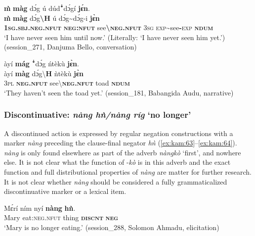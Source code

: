 \documentclass[output=paper,colorlinks,citecolor=brown]{langscibook}
\begin{document}
\ea\label{ex:kam:61} 
    \glll \textbf{\`{m}} \textbf{màg} dɔ́g ú dúdꜜdɔ́gí \textbf{jɛ́n}.\\
            \textbf{\`{m}} \textbf{màg} dɔ́g\textbf{{\textbackslash}H} ú dɔ́g{\textasciitilde}dɔ́g-i \textbf{jɛ̀n}\\
            \textbf{\textsc{1sg.sbj.neg}}\textbf{.\textsc{nfut}} \textbf{\textsc{neg}}\textbf{:\textsc{nfut}} see\textbf{{\textbackslash}}\textbf{\textsc{neg}}\textbf{.\textsc{nfut}} \textsc{3sg} \textsc{exp}{\textasciitilde}see\textbf{{}-}\textsc{exp} \textbf{\textsc{ndum}}\\
    \glt ‘I have never seen him until now.’ (Literally: ‘I have never seen him yet.’) (session\_271, Danjuma Bello, conversation)\\
\z 

\ea\label{ex:kam:62} 
    \glll àyí \textbf{mág} ꜜdɔ́g ńtèkù \textbf{jɛ̀n}.\\
        àyí \textbf{màg} dɔ́g{\textbackslash}\textbf{H} ǹtèkù \textbf{jɛ̀n}\\
        \textsc{3pl} \textbf{\textsc{neg}}\textbf{.\textsc{nfut}} see{\textbackslash}\textbf{\textsc{neg}}\textbf{.\textsc{nfut}} toad \textbf{\textsc{ndum}}\\
    \glt ‘They haven’t seen the toad yet.’ (session\_181, Babangida Audu, narrative)
\z 

\subsubsection{Discontinuative: \textit{nàng hǹ/nàng ríg} ‘no longer’}\label{sec:kam:2.6.2}

A discontinued action is expressed by regular negation constructions with a marker \textit{nàng} preceding the clause-final negator \textit{hǹ} (\ref{ex:kam:63}--\ref{ex:kam:64}). \textit{nàng} is only found elsewhere as part of the adverb \textit{nàngkò} ‘first’, and nowhere else. It is not clear what the function of -\textit{kò} is in this adverb and the exact function and full distributional properties of \textit{nàng} are matter for further research. It is not clear whether \textit{nàng} should be considered a fully grammaticalized discontinuative marker or a lexical item.

\ea\label{ex:kam:63} 
    \gll Mɛ́rí ním nyí \textbf{nàng} \textbf{hǹ}.\\
        Mary eat:\textsc{neg}.\textsc{nfut} thing \textbf{\textsc{discnt}} \textbf{\textsc{neg}}\\
    \glt ‘Mary is no longer eating.’ (session\_288, Solomon Ahmadu, elicitation)
\z 
\end{document}
